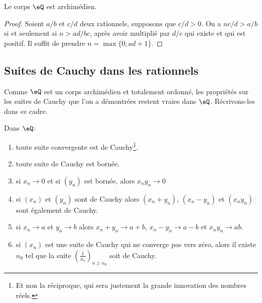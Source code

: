 \begin{lemma} \label{LEMooEBTIooGMoHsj}
  Le corps \( \eQ \) est archimédien.
\end{lemma}
\begin{proof}
  Soient \( a/b \) et \( c/d \) deux rationnels, supposons que \( c/d > 0\). On a \(n c/d > a/b \) si et seulement si \( n > ad / bc \), après avoir multiplié par \( d/c \) qui existe et qui est positif. Il suffit de prendre \(n = \max\{0; ad + 1\}\).
\end{proof}


\subsection{Suites de Cauchy dans les rationnels}
Comme \( \eQ \) est un corps archimédien et totalement ordonné, les propriétés sur les suites de Cauchy que l'on a démontrées restent vraies dans \( \eQ\). Récrivons-les dans ce cadre.
\begin{proposition}        \label{PropFFDJooAapQlP}
  Dans \( \eQ \):
    \begin{enumerate}
        \item       \label{ItemRKCIooJguHdji}
            toute suite convergente est de Cauchy\footnote{Et non la réciproque, qui sera justement la grande innovation des nombres réels.}.
        \item       \label{ItemRKCIooJguHdjii}
            toute suite de Cauchy est bornée.
        \item       \label{ItemRKCIooJguHdjiii}
            si \( x_n\to 0\) et si \( (y_n)\) est bornée, alors \( x_ny_n\to 0\)
        \item
            si \( (x_n)\) et \( (y_n)\) sont de Cauchy alors \( (x_n+y_n)\), \( (x_n-y_n)\) et \( (x_ny_n)\) sont également de Cauchy.
        \item       \label{ITEMooIAFSooAIUpAN}
            si \( x_n\to a \) et \( y_n\to b \) alors \( x_n+y_n\to a+b\), \( x_n-y_n\to a-b\) et \(  x_ny_n\to ab  \).
        \item   \label{ItemRKCIooJguHdjvi}
           si \( (x_n)\) est une suite de Cauchy qui ne converge pas vers zéro, alors il existe \( n_0\) tel que la suite \( \left( \frac{1}{ x_n } \right)_{n\geq n_0}\) soit de Cauchy.
    \end{enumerate}
\end{proposition}



